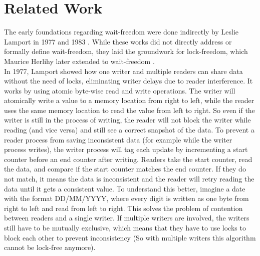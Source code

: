 \chapter{Related Work}\label{ch:related-work}

The early foundations regarding wait-freedom were done indirectly by Leslie Lamport in 1977 and 1983 \cite{Lamport1977ConcurrentReading,Lamport1983SPSCCircularBuffer}. While these works did not directly address or formally define wait-freedom, they laid the groundwork for lock-freedom, which Maurice Herlihy later extended to wait-freedom \cite{herlihy1991wait}. \\
In 1977, Lamport showed how one writer and multiple readers can share data without the need of locks, eliminating writer delays due to reader interference. It works by using atomic byte-wise read and write operations. The writer will atomically write a value to a memory location from right to left, while the reader uses the same memory location to read the value from left to right. So even if the writer is still in the process of writing, the reader will not block the writer while reading (and vice versa) and still see a correct snapshot of the data. To prevent a reader process from saving inconsistent data (for example while the writer process writes), the writer process will tag each update by incrementing a start counter before an end counter after writing. Readers take the start counter, read the data, and compare if the start counter matches the end counter. If they do not match, it means the data is inconsistent and the reader will retry reading the data until it gets a consistent value. To understand this better, imagine a date with the format DD/MM/YYYY, where every digit is written as one byte from right to left and read from left to right. This solves the problem of contention between readers and a single writer. If multiple writers are involved, the writers still have to be mutually exclusive, which means that they have to use locks to block each other to prevent inconsistency (So with multiple writers this algorithm cannot be lock-free anymore). \cite{Lamport1977ConcurrentReading} 

